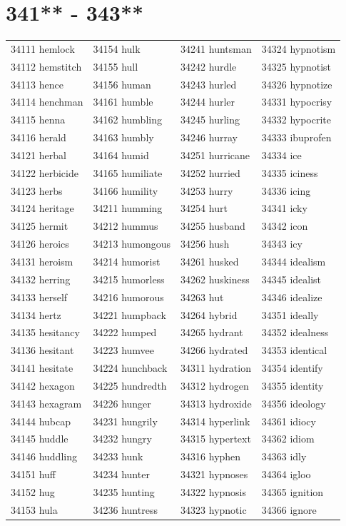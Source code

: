 \documentclass[10pt, oneside]{book}
\begin{document}
\begin{table}
	\centering
	\section*{341** - 343**}
	\begin{tabular}{l l l l}
34111 hemlock &34154 hulk &34241 huntsman &34324 hypnotism\\
34112 hemstitch &34155 hull &34242 hurdle &34325 hypnotist\\
34113 hence &34156 human &34243 hurled &34326 hypnotize\\
34114 henchman &34161 humble &34244 hurler &34331 hypocrisy\\
34115 henna &34162 humbling &34245 hurling &34332 hypocrite\\
34116 herald &34163 humbly &34246 hurray &34333 ibuprofen\\
34121 herbal &34164 humid &34251 hurricane &34334 ice\\
34122 herbicide &34165 humiliate &34252 hurried &34335 iciness\\
34123 herbs &34166 humility &34253 hurry &34336 icing\\
34124 heritage &34211 humming &34254 hurt &34341 icky\\
34125 hermit &34212 hummus &34255 husband &34342 icon\\
34126 heroics &34213 humongous &34256 hush &34343 icy\\
34131 heroism &34214 humorist &34261 husked &34344 idealism\\
34132 herring &34215 humorless &34262 huskiness &34345 idealist\\
34133 herself &34216 humorous &34263 hut &34346 idealize\\
34134 hertz &34221 humpback &34264 hybrid &34351 ideally\\
34135 hesitancy &34222 humped &34265 hydrant &34352 idealness\\
34136 hesitant &34223 humvee &34266 hydrated &34353 identical\\
34141 hesitate &34224 hunchback &34311 hydration &34354 identify\\
34142 hexagon &34225 hundredth &34312 hydrogen &34355 identity\\
34143 hexagram &34226 hunger &34313 hydroxide &34356 ideology\\
34144 hubcap &34231 hungrily &34314 hyperlink &34361 idiocy\\
34145 huddle &34232 hungry &34315 hypertext &34362 idiom\\
34146 huddling &34233 hunk &34316 hyphen &34363 idly\\
34151 huff &34234 hunter &34321 hypnoses &34364 igloo\\
34152 hug &34235 hunting &34322 hypnosis &34365 ignition\\
34153 hula &34236 huntress &34323 hypnotic &34366 ignore\\
	\end{tabular}
 \end{table}
\clearpage
\end{document}
